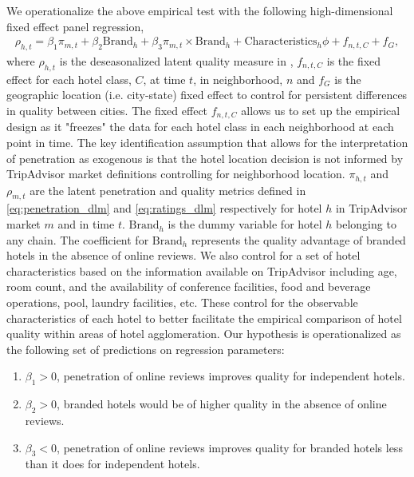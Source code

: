 \documentclass{informs_mod} %
\begin{document}
We operationalize the above empirical test with the following high-dimensional fixed effect panel regression,
\begin{equation}\label{eq:nbhd_brand}
\begin{split}
\rho_{h,t}=\beta_{1} \pi_{m,t} + \beta_{2} \text{Brand}_{h} + \beta_{3} \pi_{m,t}\times \text{Brand}_{h} + \text{Characteristics}_h\phi + f_{n,t,C}+f_{G}, %
\end{split}
\end{equation}
where $\rho_{h,t}$ is the deseasonalized latent quality measure in , $f_{n,t,C}$ is the fixed effect for each hotel class, $C$, at time $t$, in neighborhood, $n$ and $f_{G}$ is the geographic location (i.e. city-state) fixed effect to control for persistent differences in quality between cities. The fixed effect $f_{n,t,C}$ allows us to set up the empirical design as it "freezes" the data for each hotel class in each neighborhood at each point in time. The key identification assumption that allows for the interpretation of penetration as exogenous is that the hotel location decision is not informed by TripAdvisor market definitions controlling for neighborhood location. $\pi_{h,t}$ and $\rho_{m,t}$ are the latent penetration and quality metrics defined in \cref{eq:penetration_dlm} and \cref{eq:ratings_dlm} respectively for hotel $h$ in TripAdvisor market $m$ and in time $t$. $\text{Brand}_h$ is the dummy variable for hotel $h$ belonging to any chain. The coefficient for $\text{Brand}_h$ represents the quality advantage of branded hotels in the absence of online reviews. We also control for a set of hotel characteristics based on the information available on TripAdvisor including age, room count, and the availability of conference facilities, food and beverage operations, pool, laundry facilities, etc. These control for the observable characteristics of each hotel to better facilitate the empirical comparison of hotel quality within areas of hotel agglomeration. Our hypothesis is operationalized as the following set of predictions on regression parameters:
\begin{enumerate}
\item $\beta_1>0$, penetration of online reviews improves quality for independent hotels.
\item $\beta_2>0$, branded hotels would be of higher quality in the absence of online reviews.
\item $\beta_3<0$, penetration of online reviews improves quality for branded hotels less than it does for independent hotels.
\end{enumerate}
\end{document}
